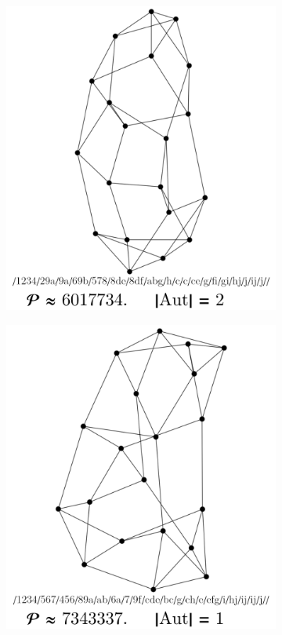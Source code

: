 \documentclass[11pt,a4paper]{article}
\renewcommand{\|}{\rule[-0.4ex]{0.2ex}{1.2em}}
\begin{document}
\begin{figure}[htb]
\begin{subfigure}[b]{.24 \textwidth}
		\subcaption{}
	\end{subfigure}
	\begin{subfigure}[b]{.24 \textwidth}
		\includegraphics[width=\linewidth]{largest_18_2}
		\subcaption{}
	\end{subfigure}
	\begin{subfigure}[b]{.24 \textwidth}
		\includegraphics[width=\linewidth]{largest_18_1}
		\subcaption{}
	\end{subfigure}
	

\end{figure}
\end{document}
